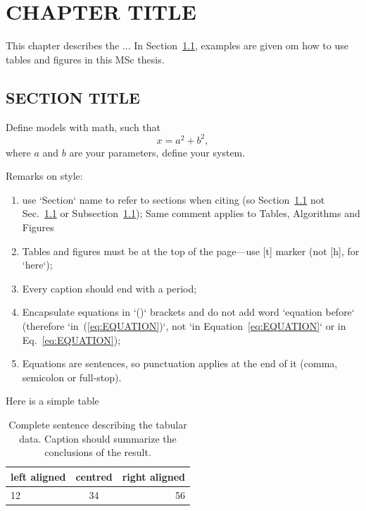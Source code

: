 \chapter{CHAPTER TITLE}
\label{chp:chapter_1}

This chapter describes the ... In Section~\ref{sec:SECTIONTITLE}, examples are given om how to use tables and figures in this MSc thesis.

\section{SECTION TITLE}
\label{sec:SECTIONTITLE}


Define models with math, such that
%
\begin{equation}
x = a^2 + b^2,
\label{eq:EQUATION}
\end{equation}
%
where $a$ and $b$ are your parameters, define your system.

Remarks on style:

\begin{enumerate}
	\item use `Section` name to refer to sections when citing (so Section~\ref{sec:SECTIONTITLE} not Sec.~\ref{sec:SECTIONTITLE} or Subsection~\ref{sec:SECTIONTITLE}); Same comment applies to Tables, Algorithms and Figures
	\item Tables and figures must be at the top of the page---use [t] marker (not [h], for `here`); 
	\item Every caption should end with a period;
	\item Encapsulate equations in `()` brackets and do not add word `equation before` (therefore `in~(\ref{eq:EQUATION})`, not `in Equation~\ref{eq:EQUATION}` or in Eq.~\ref{eq:EQUATION});
	\item Equations are sentences, so punctuation applies at the end of it (comma, semicolon or full-stop).
\end{enumerate}

Here is a simple table

\begin{table}[t]
\centering
\begin{tabular}{| l | c | r |}
\hline
left aligned & centred & right aligned \\
\hline \hline
12 & 34 & 56 \\
\hline
\end{tabular}
\caption{Complete sentence describing the tabular data. Caption should summarize the conclusions of the result.}
\label{tab:table_1}
\end{table}


